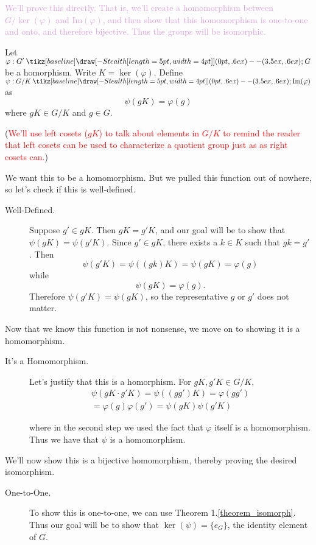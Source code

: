 \documentclass[12pt,letterpaper]{algebra_book}
\renewcommand{\to}{\mathbin{\tikz[baseline] \draw[-{Stealth[length=5pt,width=4pt]}] (0pt,.6ex) -- (3.5ex,.6ex);}}
\newcommand{\im}{\mbox{Im}}
\renewcommand{\phi}{\varphi}
\theoremstyle{definition}
\begin{document}
    \begin{prf}
        \textcolor{Plum}{We'll prove this directly. That is, we'll create a
        homomorphism between
        $G/\ker(\phi)$ and $\im(\phi)$, and then show that this
        homomorphism is one-to-one and onto, and therefore bijective.
        Thus the groups will be isomorphic.}

        Let $\phi: G' \to G$ be a homorphism. Write $K = \ker(\phi)$. 
        Define $\psi:
        G/K \to \im(\phi)$ as 
        \[
            \psi(gK) = \phi(g)
        \] 
        where $gK \in G/K$ and $g \in G$. 
        
        (\textcolor{red}{We'll use left cosets ($gK$) to talk about elements
        in $G/K$ to remind the reader that left cosets can be used to
        characterize a quotient group just as
        as right cosets can.})

        \textcolor{NavyBlue}{We want this to be a homomorphism. But we pulled this function
        out of nowhere, so let's check if this is well-defined.}
        \begin{description}
            \item[Well-Defined.]
            Suppose $g' \in gK$. Then $gK = g'K$, and our goal will be to
            show that $\psi(gK) = \psi(g'K)$. Since $g' \in gK$, there
            exists a $k \in K$ such that 
            $gk = g'$. Then  
            \[
                \psi(g'K) = \psi((gk)K) = \psi(gK) = \phi(g)
            \]
            while 
            \[
                \psi(gK) = \phi(g).
            \]
            Therefore $\psi(g'K) = \psi(gK)$, so the representative $g$ or
            $g'$ does not matter.
        \end{description}
        \textcolor{NavyBlue}{Now that we know this function is not nonsense, we move on to
        showing it is a homomorphism.}
        \begin{description}
            \item[It's a Homomorphism.]
            Let's justify that this is a homorphism. For $gK, g'K
            \in G/K$, 
            \begin{align*}
                \psi(gK \cdot g'K) =  \psi((gg')K) = \phi(gg')\\
                 = \phi(g)\phi(g') = \psi(gK)\psi(g'K)
            \end{align*}
    
            where in the second step we used the fact that $\phi$ itself
            is a homomorphism. Thus we have that $\psi$ is a homomorphism. 
        \end{description}
        \textcolor{NavyBlue}{We'll now show this is a bijective homomorphism, thereby
        proving the desired isomorphism.}
        \begin{description}
            \item[One-to-One.] To show this is one-to-one, we can use
            Theorem 1.\ref{theorem_isomorph}. Thus our goal will be to
            show that $\ker(\psi) = \{e_G\}$, the identity element of
            $G$.
            

\end{description}
\end{prf}
\end{document}
